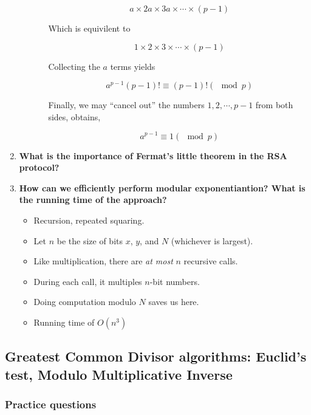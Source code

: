 \documentclass[a4paper,11pt]{article}
\begin{document}
\begin{enumerate}
\begin{itemize}
\begin{itemize}
      \[a \times 2a \times 3a \times \cdots \times (p - 1)\]

      Which is equivilent to

      \[1 \times 2 \times 3 \times \cdots \times (p - 1)\]

      Collecting the $a$ terms yields

      \[a^{p - 1} (p - 1)! \equiv (p - 1)! (\mod p)\]

      Finally, we may ``cancel out'' the numbers $1, 2, \cdots, p - 1$
      from both sides, obtains,

      \[a^{p -1} \equiv 1 (\mod p)\]
    \end{itemize}
  \end{itemize}
\item
  \textbf{What is the importance of Fermat's little theorem in the RSA
  protocol?}
\item
  \textbf{How can we efficiently perform modular exponentiantion? What
  is the running time of the approach?}

  \begin{itemize}
  \itemsep1pt\parskip0pt
  \item
    Recursion, repeated squaring.
  \item
    Let $n$ be the size of bits $x$, $y$, and $N$ (whichever is
    largest).
  \item
    Like multiplication, there are \emph{at most} $n$ recursive calls.
  \item
    During each call, it multiples $n$-bit numbers.
  \item
    Doing computation modulo $N$ saves us here.
  \item
    Running time of $O(n^3)$
  \end{itemize}
\end{enumerate}

\subsection{Greatest Common Divisor algorithms: Euclid's test, Modulo
Multiplicative
Inverse}\label{greatest-common-divisor-algorithms-euclids-test-modulo-multiplicative-inverse}

\subsubsection{Practice questions}\label{practice-questions-3}
\end{document}
